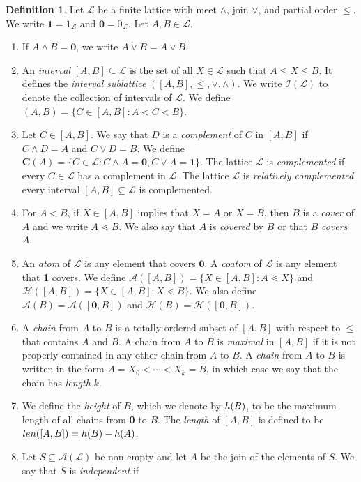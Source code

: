 \documentclass[a4paper,11pt,reqno]{article}
\theoremstyle{definition}
\newtheorem{definition}[theorem]{{{Definition}}}
\newcommand{\mL}{\mathcal{L}}
\newcommand{\mA}{\mathcal{A}}
\newcommand{\I}{\mathcal{I}}
\newcommand{\mH}{\mathcal{H}}
\newcommand{\len}{\textup{len}}
\newcommand{\h}{\textup{h}}
\newcommand{\one}{{\mathbf{1}}}
\newcommand{\zero}{{\mathbf{0}}}
\begin{document}
\begin{definition}
Let $\mathcal{L}$ be a finite lattice with meet $\wedge$, join $\vee$, and partial order $\leq$. We write $\one=1_\mathcal{L}$ and $\zero=0_\mathcal{L}$.
Let $A, B\in\mathcal{L}$.
\begin{enumerate}
    \item If $A \wedge B = \zero$, we write $A \dot \vee B = A \vee B$. 
    \item An {\em interval} $[A,B]\subseteq\mathcal{L}$ is the set of all $X\in\mathcal{L}$ such that $A\leq X\leq B$. It defines the {\em interval sublattice} $([A,B],\leq,\vee,\wedge)$. We write $\I(\mL)$ to denote the collection of intervals of $\mL$. We define $(A,B)=\{C\in[A,B]:A< C < B\}$.
    \item Let $C\in  [A,B]$. We say that $D$ is a \emph{complement} of $C$ in $[A,B]$  if $C \wedge D = A$ and $C \vee D = B$. We define $\textbf{C}(A)=\{C \in \mathcal{L}: C\wedge A=\zero, C \vee A = \one \}$. The lattice $\mathcal{L}$ is {\em complemented} if every $C \in \mL$ has a complement in $\mL$. The lattice $\mL$ is {\em relatively complemented} every interval $[A,B]\subseteq \mathcal{L}$ is complemented.
    \item For $A<B$, if $X\in[A,B]$ implies that $X=A$ or $X=B$, then $B$ is a {\em cover} of $A$ and we write $A\lessdot B$. We also say that $A$ is \emph{covered} by $B$ or that $B$ {\em covers} $A$.
    \item An {\em atom} of $\mL$ is any element that covers $\textbf{0}$. A {\em coatom} of $\mL$ is any element that \textbf{1} covers. 
    We define $\mA([A,B])=\{ X \in [A,B]: A \lessdot X \}$ and 
    $\mH([A,B])=\{X \in [A,B] : X \lessdot B\}$. We also define
    $\mA(B)=\mA([\zero,B])$ and $\mH(B)=\mH([\zero,B])$.
    \item 
    A {\em chain} from $A$ to $B$ is a totally ordered subset of $[A,B]$ with respect to $\leq$ that contains $A$ and $B$. A chain from $A$ to $B$ is {\em maximal} in $[A,B]$ if it is not properly contained in any other chain from $A$ to $B$. 
    A {\em chain} from $A$ to $B$ is written in the form
    $ A = X_0 < \cdots < X_k=B $, in which case we say that the chain has {\em length} $k$.
    \item We define the {\em height} of $B$, which we denote by $\h(B)$, to be the maximum length of all chains from \textbf{0} to $B$. The {\em length} of $[A,B]$ is defined to be $\len([A,B])=\h(B)-\h(A)$.
    \item Let $S \subseteq \mA(\mL)$ be non-empty and let $A$ be the join of the elements of $S$. We say that $S$ is {\em independent} if

\end{enumerate}
\end{definition}
\end{document}
